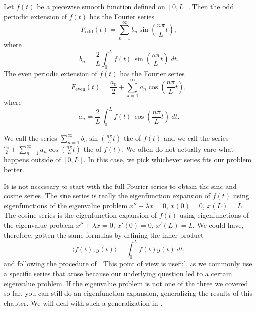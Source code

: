 \begin{theorem}
Let $f(t)$ be a piecewise smooth function defined on $[0,L]$.
Then the odd periodic extension
of $f(t)$ has the Fourier series
\begin{equation*}
\boxed{~~
F_{\text{odd}}(t) = \sum_{n=1}^\infty b_n \sin \left( \frac{n \pi}{L} t
\right) ,
~~}
\end{equation*}
where
\begin{equation*}
\boxed{~~
b_n = 
\frac{2}{L} \int_{0}^L f(t)\, \sin \left( \frac{n \pi}{L} t \right) ~ dt .
~~}
\end{equation*}
The even periodic extension of $f(t)$ has the Fourier series
\begin{equation*}
\boxed{~~
F_{\text{even}}(t) = \frac{a_0}{2} + \sum_{n=1}^\infty a_n \cos \left(
\frac{n \pi}{L} t \right) ,
~~}
\end{equation*}
where
\begin{equation*}
\boxed{~~
a_n = 
\frac{2}{L} \int_{0}^L f(t)\, \cos \left( \frac{n \pi}{L} t \right) ~ dt .
~~}
\end{equation*}
\end{theorem}

We call the series $\sum_{n=1}^\infty b_n \sin \left( \frac{n \pi}{L} t\right)$ 
the \emph{} of $f(t)$ and we call the series
$\frac{a_0}{2} + \sum_{n=1}^\infty a_n \cos \left( \frac{n \pi}{L} t
\right)$
the \emph{} of $f(t)$.  
We often do not actually care what happens outside of $[0,L]$.  In this case,
we pick whichever series fits our problem better.

It is not necessary to start with the full Fourier series to obtain
the sine and cosine series.
The sine series is really the eigenfunction expansion of $f(t)$ using 
eigenfunctions of the eigenvalue problem $x''+\lambda x = 0$, $x(0) = 0$,
$x(L) = L$.  The cosine series is the eigenfunction expansion of $f(t)$
using 
eigenfunctions of the eigenvalue problem $x''+\lambda x = 0$, $x'(0) = 0$,
$x'(L) = L$.  We could have, therefore, gotten the same formulas
by defining the inner product
\begin{equation*}
\langle f(t), g(t) \rangle = \int_0^L f(t) g(t) ~ dt ,
\end{equation*}
and following the procedure of .  This point of view is
useful, as we commonly use a specific series that arose because our underlying
question 
led to a certain eigenvalue problem.  If the eigenvalue 
problem is not one of the three we covered so far, you can still do an
eigenfunction expansion, generalizing the results of this chapter.  We will
deal with such a generalization in .


